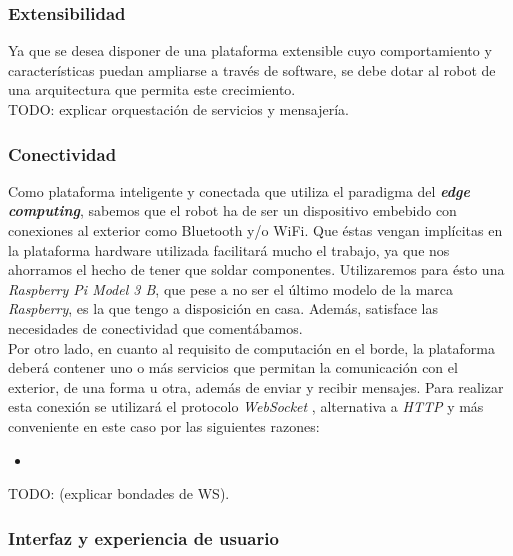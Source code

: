 \subsubsection{Extensibilidad}

Ya que se desea disponer de una plataforma extensible cuyo comportamiento y características puedan ampliarse a través de software, se debe dotar al robot de una arquitectura que permita este crecimiento.\\

TODO: explicar orquestación de servicios y mensajería.

\subsubsection{Conectividad}

Como plataforma inteligente y conectada que utiliza el paradigma del \textbf{\textit{edge computing}}, sabemos que el robot ha de ser un dispositivo embebido con conexiones al exterior como Bluetooth y/o WiFi. Que éstas vengan implícitas en la plataforma hardware utilizada facilitará mucho el trabajo, ya que nos ahorramos el hecho de tener que soldar componentes. Utilizaremos para ésto una \textit{Raspberry Pi Model 3 B}, que pese a no ser el último modelo de la marca \textit{Raspberry}, es la que tengo a disposición en casa. Además, satisface las necesidades de conectividad que comentábamos.\\

Por otro lado, en cuanto al requisito de computación en el borde, la plataforma deberá contener uno o más servicios que permitan la comunicación con el exterior, de una forma u otra, además de enviar y recibir mensajes. Para realizar esta conexión se utilizará el protocolo \textit{WebSocket} \cite{ws_protocol}, alternativa a \textit{HTTP} \cite{http_protocol} y más conveniente en este caso por las siguientes razones:

\begin{itemize}
    \item 
\end{itemize}

TODO: (explicar bondades de WS). 

\subsubsection{Interfaz y experiencia de usuario}

